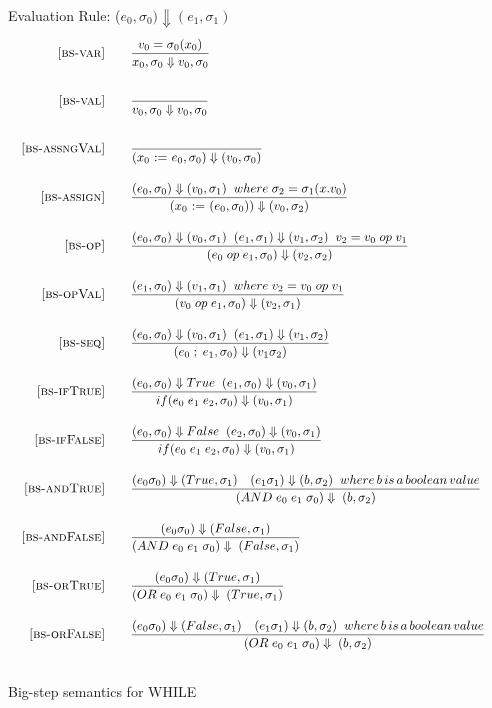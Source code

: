\documentclass{article}
\begin{document}
\newpage
\begin{figure}[H]\label{fig:bigstep}
\caption{Big-step semantics for WHILE}
Evaluation Rule: {($e_0,\sigma_0) \Downarrow (e_1,\sigma_1) $}
\[
\begin{array}{cc}
\begin{array}{r@{\qquad}l}
\bsrule{bs-var}{
  v_0 = \sigma_0(x_0)
}{
  \bstep{x_0}{\sigma_0}{v_0}{\sigma_0}
}
\bsrule{bs-val}{
}{
  \bstep{v_0}{\sigma_0}{v_0}{\sigma_0}
}
\bsrule{bs-assngVal}{
}{
({\assign {x_0} {e_0}} , {\sigma_0}) \Downarrow ({v_0}, {\sigma_0})
}
\bsrule{bs-assign}{
({e_0}, {\sigma_0}) \Downarrow ({v_0}, {\sigma_1}) \; \; where \;{\sigma_2} = {\sigma_1}(x.{v_0}) 
}{
 (\assign{x_0}({e_0}, {\sigma_0})) \Downarrow ({v_0}, {\sigma_2})
}
\bsrule{bs-op}{
  ({e_0}, {\sigma_0}) \Downarrow ({v_0}, {\sigma_1})  \; \; ({e_1}, {\sigma_1}) \Downarrow ({v_1}, {\sigma_2}) \; \; {v_2} = {v_0}\;op\;{v_1}
}{
  ({e_0}  \; op \; {e_1}, {\sigma_0})  \Downarrow ({v_2},{\sigma_2})
}
\bsrule{bs-opVal}{
  ({e_1}, {\sigma_0}) \Downarrow ({v_1}, {\sigma_1})\; \; where\;  {v_2} = {v_0}\; op \; {v_1}
}{
  ({v_0}  \; op \; {e_1}, {\sigma_0})  \Downarrow ({v_2},{\sigma_1})
}

\bsrule{bs-seq}{
  ({e_0}, {\sigma_0}) \Downarrow ({v_0}, {\sigma_1})  \; \; ({e_1}, {\sigma_1}) \Downarrow ({v_1}, {\sigma_2}) 
}{
  ({e_0}  \; ; \; {e_1}, {\sigma_0})  \Downarrow ({v_1}{\sigma_2})
}
\bsrule{bs-ifTrue}{
({e_0}, {\sigma_0})  \Downarrow True \; \; ({e_1}, {\sigma_0})  \Downarrow ({v_0},{\sigma_1})
}{
  if ({e_0}\;{e_1}\;{e_2}, {\sigma_0}) \Downarrow ({v_0},{\sigma_1})
}
\bsrule{bs-ifFalse}{
({e_0}, {\sigma_0})  \Downarrow False \; \; ({e_2}, {\sigma_0})  \Downarrow ({v_0}, {\sigma_1})
}{
  if ({e_0}\;{e_1}\;{e_2}, {\sigma_0}) \Downarrow ({v_0}, {\sigma_1})
}
\bsrule{bs-andTrue}{
  ({e_0}{\sigma_0})\Downarrow({True},{\sigma_1}) \quad ({e_1}{\sigma_1})\Downarrow({b},{\sigma_2})\;\; where\,b\,is\,a\,boolean\,value
}{
   ({AND \;e_0 \;e_1}\;{\sigma_0})\Downarrow \;({b}, {\sigma_2})
}
\bsrule{bs-andFalse}{
  ({e_0}{\sigma_0})\Downarrow(False,{\sigma_1})
}{
   ({AND \;e_0 \;e_1}\;{\sigma_0})\Downarrow \;(False, {\sigma_1})
}
\bsrule{bs-orTrue}{
  ({e_0}{\sigma_0})\Downarrow(True,{\sigma_1})
}{
   ({OR \;e_0 \;e_1}\;{\sigma_0})\Downarrow \;(True, {\sigma_1})
}
\bsrule{bs-orFalse}{
  ({e_0}{\sigma_0})\Downarrow({False},{\sigma_1}) \quad ({e_1}{\sigma_1})\Downarrow({b},{\sigma_2})\;\; where\,b\,is\,a\,boolean\,value
}{
   ({OR \;e_0 \;e_1}\;{\sigma_0})\Downarrow \;({b}, {\sigma_2})
}

\end{array}
  &
\begin{array}{r@{\qquad}l}


\end{array}
\end{array}
\]

\end{figure}
\end{document}
